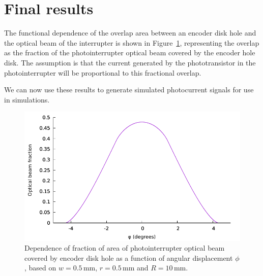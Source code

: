 \documentclass[a4paper,11pt,article]{memoir}
\begin{document}
\section*{Final results}

The functional dependence of the overlap area between an encoder disk
hole and the optical beam of the interrupter is shown in
Figure~\ref{fig:overlap-areas}, representing the overlap as the
fraction of the photointerrupter optical beam covered by the encoder
hole disk. The assumption is that the current generated by the
phototransistor in the photointerrupter will be proportional to this
fractional overlap.

We can now use these results to generate simulated photocurrent
signals for use in simulations.

\begin{figure}
  \begin{center}
    \includegraphics[width=\textwidth]{overlap-areas}
  \end{center}

  \caption{Dependence of fraction of area of photointerrupter optical
    beam covered by encoder disk hole as a function of angular
    displacement $\phi$, based on $w = 0.5\,\mathrm{mm}$, $r =
    0.5\,\mathrm{mm}$ and $R = 10\,\mathrm{mm}$.}\label{fig:overlap-areas}
\end{figure}
\end{document}
